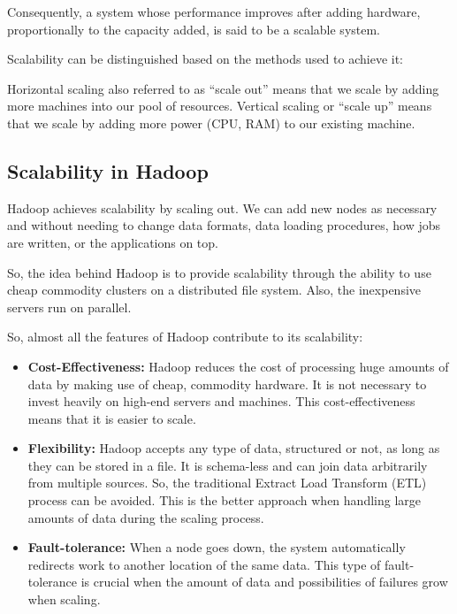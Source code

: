 \documentclass[a4paper,12pt,oneside]{report}
\begin{document}
Consequently, a system whose performance improves after adding hardware,
proportionally to the capacity added, is said to be a scalable system.

Scalability can be distinguished based on the methods used to achieve it:

Horizontal scaling also referred to as “scale out” means that we scale by adding more
machines into our pool of resources.
Vertical scaling or “scale up” means that we scale by adding more power (CPU, RAM) to
our existing machine.

\subsection{Scalability in Hadoop}

Hadoop achieves scalability by scaling out. We can add new nodes as necessary and without needing to change data formats, data loading procedures, how jobs are written, or the applications on top.

So, the idea behind Hadoop is to provide scalability through the ability to use cheap commodity clusters on a distributed file system. 
Also, the inexpensive servers run on parallel. 

So, almost all the features of Hadoop contribute to its scalability:

\begin{itemize}

        \item \textbf{Cost-Effectiveness:} Hadoop reduces the cost of processing huge amounts of data by making use of cheap, commodity hardware. 
                It is not necessary to invest heavily on high-end servers and machines. 
                This cost-effectiveness means that it is easier to scale.

        \item \textbf{Flexibility:} Hadoop accepts any type of data, structured or not, as long as they can be stored in a file. 
                It is schema-less and can join data arbitrarily from multiple sources. 
                So, the traditional Extract Load Transform (ETL) process can be avoided. 
                This is the better approach when handling large amounts of data during the scaling process.

        \item \textbf{Fault-tolerance:} When a node goes down, the system automatically redirects work to another location of the same data. 
                This type of fault-tolerance is crucial when the amount of data and possibilities of failures grow when scaling.

\end{itemize}
\end{document}
